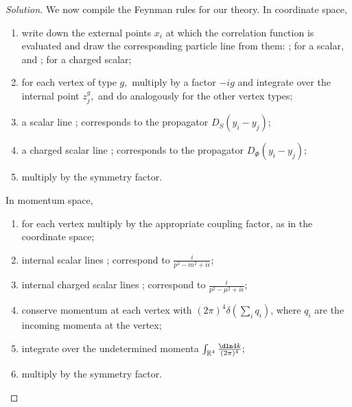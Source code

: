 \begin{proof}[Solution]
   We now compile the Feynman rules for our theory. In coordinate space, 
   \begin{enumerate}[label=(\alph*)]
      \item write down the external points \(x_i\) at which the correlation function is evaluated and draw the corresponding particle line from them:  ; for a scalar, and ; for a charged scalar;
      \item for each vertex of type \(g,\) multiply by a factor \(-ig\) and integrate over the internal point \(z_j^g,\) and do analogously for the other vertex types;
      \item a scalar line ; corresponds to the propagator \(D_S(y_i - y_j)\);
      \item a charged scalar line ; corresponds to the propagator \(D_\Phi(y_i - y_j)\);
      \item multiply by the symmetry factor.
   \end{enumerate}
   In momentum space,
   \begin{enumerate}[label=(\alph*)]
       \item for each vertex multiply by the appropriate coupling factor, as in the coordinate space;
       \item internal scalar lines ; correspond to \(\frac{i}{p^2 - m^2 + i \epsilon}\);
       \item internal charged scalar lines ; correspond to \(\frac{i}{p^2 - \mu^2 + i \epsilon}\);
       \item conserve momentum at each vertex with \((2\pi)^4\delta(\sum_i q_i)\), where \(q_i\) are the incoming momenta at the vertex;
       \item integrate over the undetermined momenta \(\int_{\mathbb{R}^4}\frac{\dln4k}{(2\pi)^4};\)
       \item multiply by the symmetry factor.
   \end{enumerate}
\end{proof}
